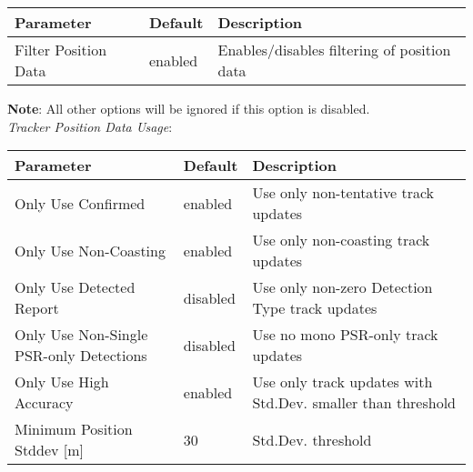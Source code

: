 \begin{table}[H]
    \center
    \begin{tabularx}{\textwidth}{ | l | l | X |}
        \hline
        \textbf{Parameter} & \textbf{Default} & \textbf{Description} \\ \hline
        Filter Position Data & enabled & Enables/disables filtering of position data \\ \hline
    \end{tabularx}
\end{table}

\textbf{Note}: All other options will be ignored if this option is disabled. \\

\textit{Tracker Position Data Usage}:
\begin{table}[H]
    \center
    \begin{tabularx}{\textwidth}{ | l | l | X |}
        \hline
        \textbf{Parameter} & \textbf{Default} & \textbf{Description} \\ \hline
        Only Use Confirmed & enabled & Use only non-tentative track updates \\ \hline
        Only Use Non-Coasting & enabled & Use only non-coasting track updates \\ \hline
        Only Use Detected Report & disabled & Use only non-zero Detection Type track updates \\ \hline
        Only Use Non-Single PSR-only Detections & disabled & Use no mono PSR-only track updates \\ \hline
        Only Use High Accuracy & enabled & Use only track updates with Std.Dev. smaller than threshold \\ \hline
        Minimum Position Stddev [m] & 30 & Std.Dev. threshold \\ \hline
    \end{tabularx}
\end{table}

